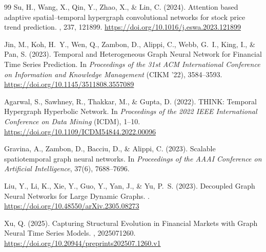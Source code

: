 \documentclass[11pt,a4paper]{article}
\begin{document}
\begin{thebibliography}{99}
Su, H., Wang, X., Qin, Y., Zhao, X., \& Lin, C. (2024).
\newblock Attention based adaptive spatial--temporal hypergraph convolutional networks for stock price trend prediction.
, 237, 121899.
\newblock \url{https://doi.org/10.1016/j.eswa.2023.121899}

Jin, M., Koh, H.~Y., Wen, Q., Zambon, D., Alippi, C., Webb, G.~I., King, I., \& Pan, S. (2023).
\newblock Temporal and Heterogeneous Graph Neural Network for Financial Time Series Prediction.
\newblock In {\em Proceedings of the 31st ACM International Conference on Information and Knowledge Management} (CIKM '22), 3584--3593.
\newblock \url{https://doi.org/10.1145/3511808.3557089}

Agarwal, S., Sawhney, R., Thakkar, M., \& Gupta, D. (2022).
\newblock THINK: Temporal Hypergraph Hyperbolic Network.
\newblock In {\em Proceedings of the 2022 IEEE International Conference on Data Mining} (ICDM), 1--10.
\newblock \url{https://doi.org/10.1109/ICDM54844.2022.00096}

Gravina, A., Zambon, D., Bacciu, D., \& Alippi, C. (2023).
\newblock Scalable spatiotemporal graph neural networks.
\newblock In {\em Proceedings of the AAAI Conference on Artificial Intelligence}, 37(6), 7688--7696.

Liu, Y., Li, K., Xie, Y., Guo, Y., Yan, J., \& Yu, P.~S. (2023).
\newblock Decoupled Graph Neural Networks for Large Dynamic Graphs.
.
\newblock \url{https://doi.org/10.48550/arXiv.2305.08273}

Xu, Q. (2025).
\newblock Capturing Structural Evolution in Financial Markets with Graph Neural Time Series Models.
, 2025071260.
\newblock \url{https://doi.org/10.20944/preprints202507.1260.v1}

\end{thebibliography}
\end{document}

